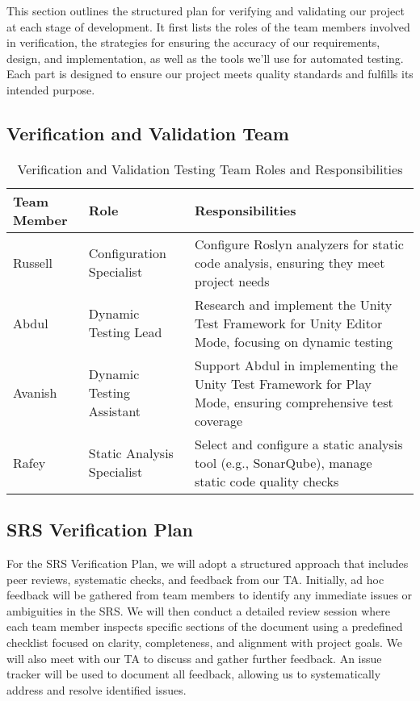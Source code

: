 \documentclass[12pt, titlepage]{article}
\begin{document}
This section outlines the structured plan for verifying and validating our project at each stage of development. It first lists the roles of the team members involved in verification, the strategies for ensuring the accuracy of our requirements, design, and implementation, as well as the tools we'll use for automated testing. Each part is designed to ensure our project meets quality standards and fulfills its intended purpose.

\subsection{Verification and Validation Team}

\begin{table}[h!]
\centering
\begin{tabularx}{\textwidth}{|l|l|X|}
\hline
\textbf{Team Member} & \textbf{Role} & \textbf{Responsibilities} \\ \hline
Russell & Configuration Specialist & Configure Roslyn analyzers for static code analysis, ensuring they meet project needs \\ \hline
Abdul & Dynamic Testing Lead & Research and implement the Unity Test Framework for Unity Editor Mode, focusing on dynamic testing \\ \hline
Avanish & Dynamic Testing Assistant & Support Abdul in implementing the Unity Test Framework for Play Mode, ensuring comprehensive test coverage \\ \hline
Rafey & Static Analysis Specialist & Select and configure a static analysis tool (e.g., SonarQube), manage static code quality checks \\ \hline
\end{tabularx}
\caption{Verification and Validation Testing Team Roles and Responsibilities}
\end{table}

\subsection{SRS Verification Plan}

For the SRS Verification Plan, we will adopt a structured approach that includes peer reviews, systematic checks, and feedback from our TA. Initially, ad hoc feedback will be gathered from team members to identify any immediate issues or ambiguities in the SRS. We will then conduct a detailed review session where each team member inspects specific sections of the document using a predefined checklist focused on clarity, completeness, and alignment with project goals. We will also meet with our TA to discuss and gather further feedback. An issue tracker will be used to document all feedback, allowing us to systematically address and resolve identified issues.
\end{document}
